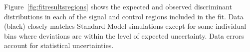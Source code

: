 Figure~\ref{fig:fitresultsregions} shows the expected and observed discriminant distributions in each of the signal and control regions included in the fit. Data (black) closely matches Standard Model simulations except for some individual bins where deviations are within the level of expected uncertainty. Data errors account for statistical uncertainties. 

\begin{figure}[!h]
\centering
  \hfill
  \hfill
  \hfill
  \hfill
\end{figure}

